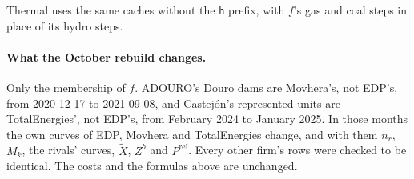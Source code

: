 \documentclass[11pt]{article}
\newcommand{\Xt}{\tilde X}
\newcommand{\code}[1]{\texttt{\small #1}}
\begin{document}
\noindent Thermal uses the same caches without the \code{h} prefix, with $f$'s gas and coal
steps in place of its hydro steps.

\paragraph{What the October rebuild changes.} Only the membership of $f$. ADOURO's Douro dams
are Movhera's, not EDP's, from 2020-12-17 to 2021-09-08, and Castejón's represented units are
TotalEnergies', not EDP's, from February 2024 to January 2025. In those months the own curves
of EDP, Movhera and TotalEnergies change, and with them $n_r$, $M_k$, the rivals' curves,
$\Xt$, $Z^b$ and $P^{\text{rel}}$. Every other firm's rows were checked to be identical. The
costs and the formulas above are unchanged.
\end{document}
